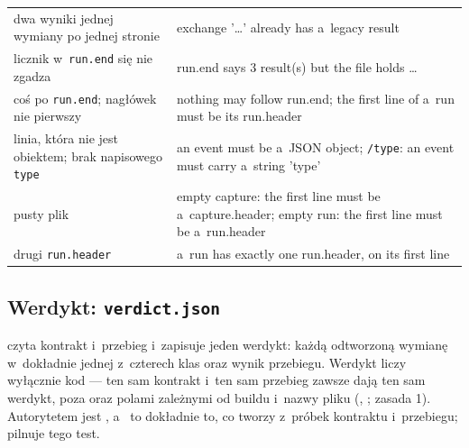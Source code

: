 {\begin{xltabular}{\linewidth}{@{}>{\raggedright\arraybackslash}p{4.6cm} >{\raggedright\arraybackslash}X@{}}
dwa wyniki jednej wymiany po jednej stronie & exchange '…' already has a~legacy result \\
licznik w~\texttt{run.end} się nie zgadza & run.end says 3 result(s) but the file holds … \\
coś po \texttt{run.end}; nagłówek nie pierwszy & nothing may follow run.end; the first line
of a~run must be its run.header \\
linia, która nie jest obiektem; brak napisowego \texttt{type} & an event must be a~JSON object;
\texttt{/type}: an event must carry a~string 'type' \\
pusty plik & empty capture: the first line must be a~capture.header; empty run: the first line
must be a~run.header \\
drugi \texttt{run.header} & a~run has exactly one run.header, on its first line \\
\end{xltabular}
}


\subsection{Werdykt: \texttt{verdict.json}}\label{sec:formaty-werdykt}

 czyta kontrakt i~przebieg i~zapisuje jeden werdykt: każdą odtworzoną
wymianę w~dokładnie jednej z~czterech klas oraz wynik przebiegu. Werdykt liczy wyłącznie kod
--- ten sam kontrakt i~ten sam przebieg zawsze dają ten sam werdykt, poza
 oraz polami zależnymi od buildu i~nazwy pliku (,
; zasada 1). Autorytetem jest , a~ to dokładnie to, co  tworzy z~próbek kontraktu i~przebiegu; pilnuje tego test.

